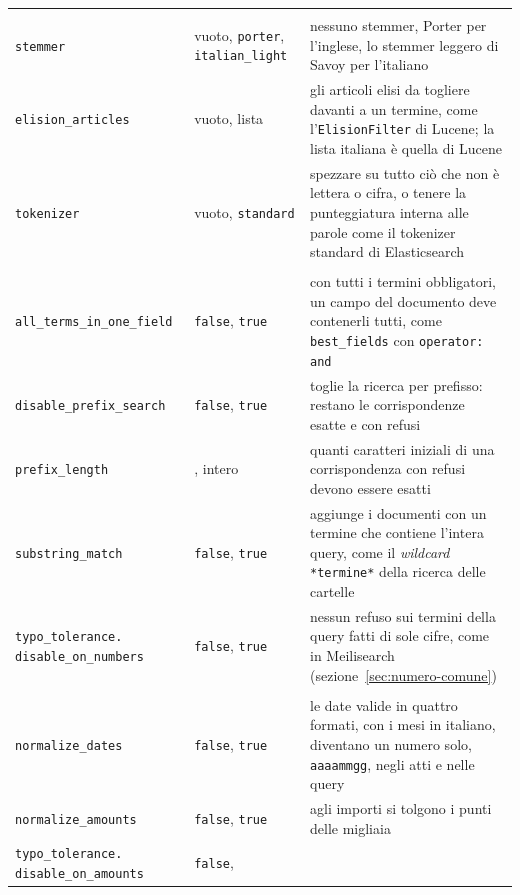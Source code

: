 {\begin{longtable}{>{\raggedright\arraybackslash}p{4.1cm}>{\raggedright\arraybackslash}p{2.5cm}>{\raggedright\arraybackslash}p{6cm}}
{  (sezioni~\ref{sec:stopword} e~\ref{sec:italiana})} \\
  \texttt{stemmer} & vuoto, \texttt{porter}, \texttt{italian\_light} & nessuno
  stemmer, Porter per l'inglese, lo stemmer leggero di Savoy per l'italiano \\
  \texttt{elision\_articles} & vuoto, lista & gli articoli elisi da togliere
  davanti a un termine, come l'\texttt{ElisionFilter} di Lucene; la lista
  italiana è quella di Lucene \\
  \texttt{tokenizer} & vuoto, \texttt{standard} & spezzare su tutto ciò che non è
  lettera o cifra, o tenere la punteggiatura interna alle parole come il
  tokenizer standard di Elasticsearch \\
  \midrule
  \multicolumn{3}{l}{\emph{Compatibilità con Elasticsearch}
  (sezioni~\ref{sec:innesto} e~\ref{sec:differenze})} \\
  \texttt{all\_terms\_in\_one\_field} & \texttt{false}, \texttt{true} & con
  tutti i termini obbligatori, un campo del documento deve contenerli tutti, come
  \texttt{best\_fields} con \texttt{operator: and} \\
  \texttt{disable\_prefix\_search} & \texttt{false}, \texttt{true} & toglie la
  ricerca per prefisso: restano le corrispondenze esatte e con refusi \\
  \texttt{prefix\_length} & 0, intero & quanti caratteri iniziali di una
  corrispondenza con refusi devono essere esatti \\
  \texttt{substring\_match} & \texttt{false}, \texttt{true} & aggiunge i
  documenti con un termine che contiene l'intera query, come il
  \emph{wildcard} \texttt{*termine*} della ricerca delle cartelle \\
  \texttt{typo\_tolerance.} \texttt{disable\_on\_numbers} & \texttt{false},
  \texttt{true} & nessun refuso sui termini della query fatti di sole cifre, come
  in Meilisearch (sezione~\ref{sec:numero-comune}) \\
  \midrule
  \multicolumn{3}{l}{\emph{Date e importi} (sezione~\ref{sec:date})} \\
  \texttt{normalize\_dates} & \texttt{false}, \texttt{true} & le date valide in
  quattro formati, con i mesi in italiano, diventano un numero solo,
  \texttt{aaaammgg}, negli atti e nelle query \\
  \texttt{normalize\_amounts} & \texttt{false}, \texttt{true} & agli importi si
  tolgono i punti delle migliaia \\
  \texttt{typo\_tolerance.} \texttt{disable\_on\_amounts} & \texttt{false},

\end{longtable}}
